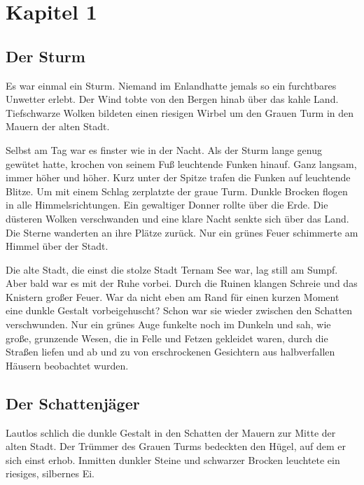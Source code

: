 \documentclass[12pt,a4paper,onecolumn,twoside,ngerman]{book}
\newcommand{\Tern}{Tern}
\newcommand{\Enland}{Enland}
\begin{document}
  
  

\chapter{Kapitel 1}
\section{Der Sturm}

Es war einmal ein Sturm.
Niemand im \Enland hatte jemals so ein furchtbares Unwetter erlebt. Der Wind tobte von den Bergen hinab über das kahle Land. Tiefschwarze Wolken bildeten einen riesigen Wirbel um den Grauen Turm in den Mauern der alten Stadt. 

Selbst am Tag war es finster wie in der Nacht. Als der Sturm lange genug gewütet hatte, krochen von seinem Fuß leuchtende Funken hinauf. Ganz langsam, immer höher und höher. Kurz unter der Spitze trafen die Funken auf leuchtende Blitze. Um mit einem Schlag zerplatzte der graue Turm. Dunkle Brocken flogen in alle Himmelsrichtungen. Ein gewaltiger Donner rollte über die Erde. Die düsteren Wolken verschwanden und eine klare Nacht senkte sich über das Land. Die Sterne wanderten an ihre Plätze zurück. Nur ein grünes Feuer schimmerte am Himmel über der Stadt.

Die alte Stadt, die einst die stolze Stadt \Tern am See war, lag still am Sumpf. Aber bald war es mit der Ruhe vorbei. Durch die Ruinen klangen Schreie und das Knistern großer Feuer. War da nicht eben am Rand für einen kurzen Moment eine dunkle Gestalt vorbeigehuscht? Schon war sie wieder zwischen den Schatten verschwunden. Nur ein grünes Auge funkelte noch im Dunkeln und sah, wie große, grunzende Wesen, die in Felle und Fetzen gekleidet waren, durch die Straßen liefen und ab und zu von erschrockenen Gesichtern aus halbverfallen Häusern beobachtet wurden.

\section{Der Schattenjäger}
Lautlos schlich die dunkle Gestalt in den Schatten der Mauern zur Mitte der alten Stadt. Der Trümmer des Grauen Turms bedeckten den Hügel, auf dem er sich einst erhob. Inmitten dunkler Steine und schwarzer Brocken leuchtete ein riesiges, silbernes Ei. 
\end{document}
